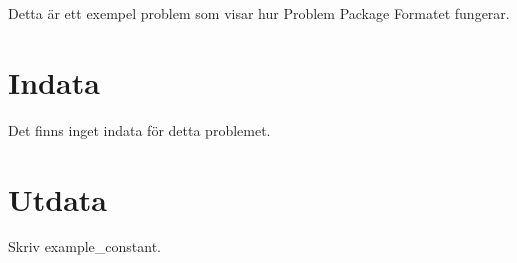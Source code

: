 Detta är ett exempel problem som visar hur Problem Package Formatet fungerar.
\section*{Indata}
Det finns inget indata för detta problemet.
\section*{Utdata}
Skriv {{example_constant}}.

